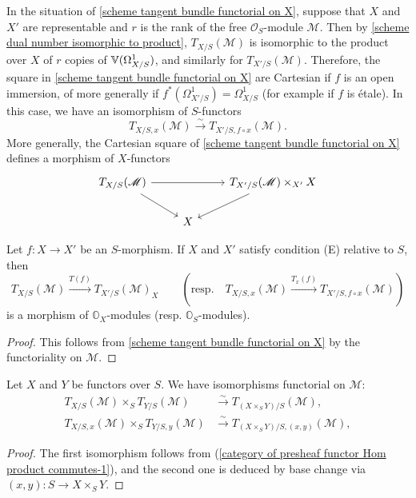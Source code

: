 \begin{remark}\label{scheme tangent space of representable isomorphism if etale}
In the situation of \cref{scheme tangent bundle functorial on X}, suppose that $X$ and $X'$ are representable and $r$ is the rank of the free $\mathscr{O}_S$-module $\mathscr{M}$. Then by \cref{scheme dual number isomorphic to product}, $T_{X/S}(\mathscr{M})$ is isomorphic to the product over $X$ of $r$ copies of $\mathbb{V}(\Omega_{X/S}^1)$, and similarly for $T_{X'/S}(\mathscr{M})$. Therefore, the square in \cref{scheme tangent bundle functorial on X} are Cartesian if $f$ is an open immersion, of more generally if $f^*(\Omega_{X'/S}^1)=\Omega_{X/S}^1$ (for example if $f$ is \'etale). In this case, we have an isomorphism of $S$-functors 
\[T_{X/S,x}(\mathscr{M})\stackrel{\sim}{\to} T_{X'/S,f\circ x}(\mathscr{M}).\]
More generally, the Cartesian square of \cref{scheme tangent bundle functorial on X} defines a morphism of $X$-functors
\[\begin{tikzcd}
T_{X/S}(\mathscr{M})\ar[rr]\ar[rd]&&T_{X'/S}(\mathscr{M})\times_{X'}X\ar[ld]\\
&X&
\end{tikzcd}\]
\end{remark}

\begin{proposition}\label{scheme tangent bundle condition (E) functorial on X}
Let $f:X\to X'$ be an $S$-morphism. If $X$ and $X'$ satisfy condition (E) relative to $S$, then
\[T_{X/S}(\mathscr{M})\stackrel{T(f)}{\to} T_{X'/S}(\mathscr{M})_X\quad\quad (\text{resp.}\quad T_{X/S,x}(\mathscr{M})\stackrel{T_x(f)}{\to} T_{X'/S,f\circ x}(\mathscr{M}))\]
is a morphism of $\mathbb{O}_X$-modules (resp. $\mathbb{O}_S$-modules).
\end{proposition}
\begin{proof}
This follows from \cref{scheme tangent bundle functorial on X} by the functoriality on $\mathscr{M}$.
\end{proof}

\begin{proposition}\label{scheme tangent bundle fiber product commutes}
Let $X$ and $Y$ be functors over $S$. We have isomorphisms functorial on $\mathscr{M}$:
\begin{align}
T_{X/S}(\mathscr{M})\times_ST_{Y/S}(\mathscr{M})&\stackrel{\sim}{\to} T_{(X\times_SY)/S}(\mathscr{M}),\label{scheme tangent bundle fiber product commutes-1}\\
T_{X/S,x}(\mathscr{M})\times_ST_{Y/S,y}(\mathscr{M})&\stackrel{\sim}{\to} T_{(X\times_SY)/S,(x,y)}(\mathscr{M}),\label{scheme tangent bundle fiber product commutes-2}
\end{align}
\end{proposition}
\begin{proof}
The first isomorphism follows from (\ref{category of presheaf functor Hom product commutes-1}), and the second one is deduced by base change via $(x,y):S\to X\times_SY$.
\end{proof}


